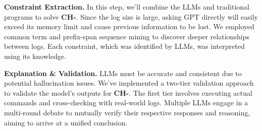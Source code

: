 \noindent
{\bf Constraint Extraction.} In this step, we'll combine the LLMs and traditional programs to solve {\bf CH-}. Since the log size is large, asking GPT directly will easily exceed its memory limit and cause previous information to be lost. We employed common term and prefix-span sequence mining to discover deeper relationships between logs. Each constraint, which was identified by LLMs, was interpreted using its knowledge. 

\noindent
{\bf Explanation \& Validation.} LLMs must be accurate and consistent due to potential hallucination issues. We've implemented a two-tier validation approach to validate the model's outputs for {\bf CH-}. The first tier involves executing actual commands and cross-checking with real-world logs. Multiple LLMs engage in a multi-round debate to mutually verify their respective responses and reasoning, aiming to arrive at a unified conclusion. 







